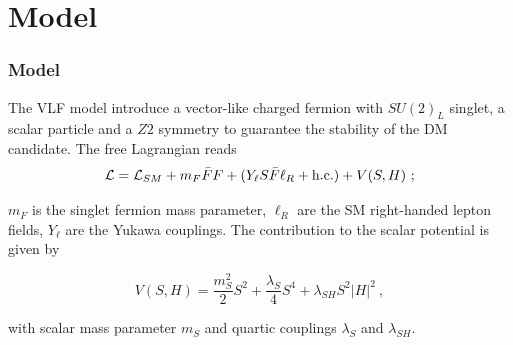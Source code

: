 \documentclass{beamer}
\begin{document}
\section{Model}
\begin{frame}
\frametitle{Model}
\begin{justify}

The VLF model introduce a vector-like charged fermion with $SU(2)_L$ singlet, a scalar particle and a $Z2$ symmetry to guarantee the stability of the DM candidate. The free Lagrangian reads
\begin{equation}\nonumber
\mathcal{L} = \mathcal{L}_{SM} +  m_F \bar{F}F + ( Y_\ell S \bar{F}\ell_R + {\rm h.c.} ) + V(S,H)~;
\end{equation}\label{EQ}

$m_F$ is the singlet fermion mass parameter, $\ell_R$ are the SM right-handed lepton fields, $Y_\ell$ 
are the Yukawa couplings. The contribution to the scalar potential is given by

\begin{equation}\nonumber
V(S,H) = \frac{m_S^2}{2} S^2 + \frac{\lambda_S}{4} S^4 + \lambda_{SH} S^2|H|^2 ~,
\end{equation}

with scalar mass parameter $m_S$ and quartic couplings $\lambda_{S}$ and $\lambda_{SH}$.


\end{justify}

\end{frame}
\end{document}
